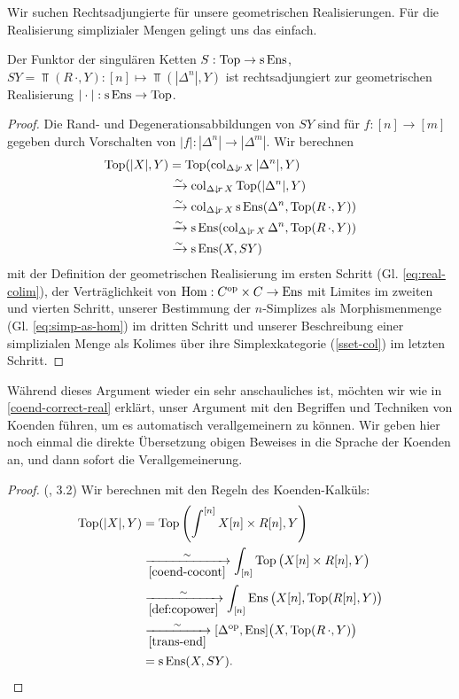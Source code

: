 Wir suchen Rechtsadjungierte für unsere geometrischen
Realisierungen. Für die Realisierung simplizialer Mengen gelingt uns
das einfach.
\begin{satz}
  Der Funktor der singulären Ketten $S: \operatorname{Top} \to \operatorname{s}\operatorname{Ens}$, $SY
  = \Top(R \, \cdot, Y): [n] \mapsto \Top(|\Delta^n|, Y)$ ist
  rechtsadjungiert zur geometrischen Realisierung
  $|\cdot|: \operatorname{s}\operatorname{Ens} \to \operatorname{Top}$.
\end{satz}
\begin{proof}
  Die Rand- und Degenerationsabbildungen von $SY$ sind für $f: [n] \to
  [m]$ gegeben durch Vorschalten von $|f|: |\Delta^n| \to
  |\Delta^m|$. Wir berechnen
  \begin{align*}
    \operatorname{Top}(|X|, Y)
    & = \operatorname{Top}(\operatorname{col}_{\Delta \downarrow \! {\scriptstyle r} \, X} |\Delta^n|, Y) \\
    & \xrightarrow[]{\sim} \operatorname{col}_{\Delta \downarrow \! {\scriptstyle r} \, X} \operatorname{Top}(|\Delta^n|, Y) \\
    & \xrightarrow[]{\sim} \operatorname{col}_{\Delta \downarrow \! {\scriptstyle r} \, X} \operatorname{s}\operatorname{Ens}(\Delta^n, \operatorname{Top}(R \, \cdot, Y)) \\
    & \xrightarrow[]{\sim} \operatorname{s}\operatorname{Ens}(\operatorname{col}_{\Delta \downarrow \! {\scriptstyle r} \, X} \Delta^n, \operatorname{Top}(R \, \cdot, Y)) \\
    & \xrightarrow[]{\sim} \operatorname{s}\operatorname{Ens}(X, SY)
  \end{align*}  
  mit der Definition der geometrischen Realisierung im ersten Schritt
  (Gl. \ref{eq:real-colim}), der Verträglichkeit von $\operatorname{Hom}: C^\mathrm{op}
  \times C \to \operatorname{Ens}$ mit Limites im zweiten und vierten Schritt,
  unserer Bestimmung der $n$-Simplizes als Morphismenmenge
  (Gl. \ref{eq:simp-as-hom}) im dritten Schritt und unserer
  Beschreibung einer simplizialen Menge als Kolimes über ihre
  Simplexkategorie (\ref{sset-col}) im letzten Schritt.
\end{proof}
Während dieses Argument wieder ein sehr anschauliches ist, möchten wir
wie in \ref{coend-correct-real} erklärt, unser Argument mit den
Begriffen und Techniken von Koenden führen, um es automatisch
verallgemeinern zu können. Wir geben hier noch einmal die direkte
Übersetzung obigen Beweises in die Sprache der Koenden an, und dann
sofort die Verallgemeinerung.
\begin{proof} (\cite{Lore}, 3.2)
  Wir berechnen mit den Regeln des Koenden-Kalküls:
  \begin{align*}
     \operatorname{Top}(|X|, Y)
     &= \operatorname{Top} \left( \int^{[n]} X[n] \times R[n], Y \right) \\
     & \xrightarrow[\ref{coend-cocont}]{\sim}
       \int_{[n]} \operatorname{Top} \big( X[n] \times R[n], Y \big) \\
     & \xrightarrow[\ref{def:copower}]{\sim}
       \int_{[n]} \operatorname{Ens} \big( X[n], \operatorname{Top}(R[n], Y) \big) \\
     & \xrightarrow[\ref{trans-end}]{\sim}
       [\Delta^\mathrm{op}, \operatorname{Ens}] \big( X, \operatorname{Top}(R \, \cdot, Y) \big) \\
     &= \operatorname{s}\operatorname{Ens}(X, SY).
  \end{align*}
\end{proof}


